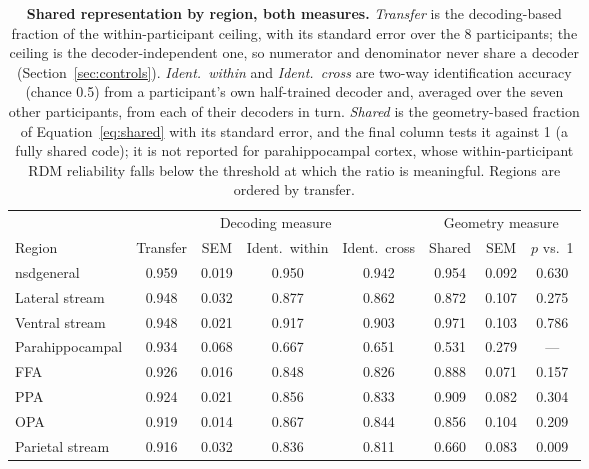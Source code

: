 \documentclass[11pt,a4paper]{article}
\begin{document}
\begin{table}[tb]
\centering
\caption{\textbf{Shared representation by region, both measures.} \emph{Transfer}
is the decoding-based fraction of the within-participant ceiling, with its
standard error over the 8 participants; the ceiling is the decoder-independent
one, so numerator and denominator never share a decoder
(Section~\ref{sec:controls}). \emph{Ident.\ within} and \emph{Ident.\ cross} are
two-way identification accuracy (chance \num{0.5}) from a participant's own
half-trained decoder and, averaged over the seven other participants, from each
of their decoders in turn. \emph{Shared} is
the geometry-based fraction of Equation~\ref{eq:shared} with its standard error,
and the final column tests it against 1 (a fully shared code); it is not reported
for parahippocampal cortex, whose within-participant RDM reliability falls below
the threshold at which the ratio is meaningful. Regions are ordered by transfer.}
\label{tab:main}
\small
\begin{tabular}{lccccccc}
\toprule
 & \multicolumn{4}{c}{Decoding measure} & \multicolumn{3}{c}{Geometry measure} \\
\cmidrule(lr){2-5}\cmidrule(lr){6-8}
Region & Transfer & SEM & Ident.\ within & Ident.\ cross & Shared & SEM & $p$ vs.\ 1 \\
\midrule
nsdgeneral          & \num{0.959} & \num{0.019} & \num{0.950} & \num{0.942} & \num{0.954} & \num{0.092} & 0.630 \\
Lateral stream      & \num{0.948} & \num{0.032} & \num{0.877} & \num{0.862} & \num{0.872} & \num{0.107} & 0.275 \\
Ventral stream      & \num{0.948} & \num{0.021} & \num{0.917} & \num{0.903} & \num{0.971} & \num{0.103} & 0.786 \\
Parahippocampal     & \num{0.934} & \num{0.068} & \num{0.667} & \num{0.651} & \num{0.531} & \num{0.279} & --- \\
FFA                 & \num{0.926} & \num{0.016} & \num{0.848} & \num{0.826} & \num{0.888} & \num{0.071} & 0.157 \\
PPA                 & \num{0.924} & \num{0.021} & \num{0.856} & \num{0.833} & \num{0.909} & \num{0.082} & 0.304 \\
OPA                 & \num{0.919} & \num{0.014} & \num{0.867} & \num{0.844} & \num{0.856} & \num{0.104} & 0.209 \\
Parietal stream     & \num{0.916} & \num{0.032} & \num{0.836} & \num{0.811} & \num{0.660} & \num{0.083} & 0.009 \\

\end{tabular}
\end{table}
\end{document}
